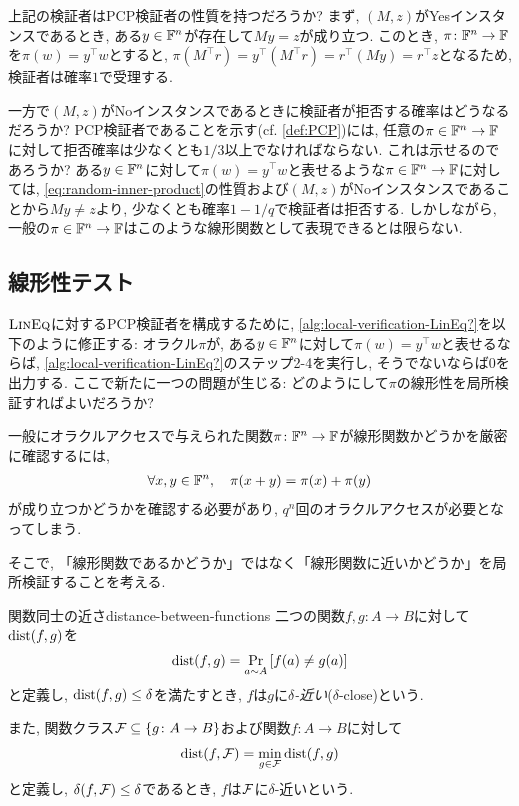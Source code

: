 上記の検証者はPCP検証者の性質を持つだろうか?
まず, $(M,z)$がYesインスタンスであるとき, ある$y\in\mathbb{F}^n$が存在して$My=z$が成り立つ.
このとき, $\pi\colon\mathbb{F}^n\to\mathbb{F}$を$\pi(w)=y^\top w$とすると, $\pi(M^\top r)=y^\top (M^\top r)=r^\top (My)=r^\top z$となるため, 検証者は確率$1$で受理する.

一方で$(M,z)$がNoインスタンスであるときに検証者が拒否する確率はどうなるだろうか?
PCP検証者であることを示す(cf. \cref{def:PCP})には, 任意の$\pi\in\mathbb{F}^n\to\mathbb{F}$に対して拒否確率は少なくとも$1/3$以上でなければならない.
これは示せるのであろうか?
ある$y\in\mathbb{F}^n$に対して$\pi(w)=y^\top w$と表せるような$\pi\in\mathbb{F}^n\to\mathbb{F}$に対しては, \cref{eq:random-inner-product}の性質および$(M,z)$がNoインスタンスであることから$My\ne z$より, 少なくとも確率$1-1/q$で検証者は拒否する.
しかしながら, 一般の$\pi\in\mathbb{F}^n\to\mathbb{F}$はこのような線形関数として表現できるとは限らない.

\subsection{線形性テスト}
$\textsc{LinEq}$に対するPCP検証者を構成するために,
\cref{alg:local-verification-LinEq?}を以下のように修正する:
オラクル$\pi$が, ある$y\in\mathbb{F}^n$に対して$\pi(w)=y^\top w$と表せるならば, \cref{alg:local-verification-LinEq?}のステップ2-4を実行し, そうでないならば$0$を出力する.
ここで新たに一つの問題が生じる: どのようにして$\pi$の線形性を局所検証すればよいだろうか?

一般にオラクルアクセスで与えられた関数$\pi\colon\mathbb{F}^n\to\mathbb{F}$が線形関数かどうかを厳密に確認するには,
\begin{align}
  \forall x,y\in\mathbb{F}^n,\quad \pi(x+y)=\pi(x)+\pi(y) \label{eq:linearity-test-all-points}
\end{align}
が成り立つかどうかを確認する必要があり, $q^n$回のオラクルアクセスが必要となってしまう.

そこで, 「線形関数であるかどうか」ではなく「線形関数に近いかどうか」を局所検証することを考える.
\begin{definition}{関数同士の近さ}{distance-between-functions}
  二つの関数$f,g\colon A \to B$に対して$\mathrm{dist}(f,g)$を
  \begin{align*}
    \mathrm{dist}(f,g) =\Pr_{a\sim A} \qty[ f(a) \ne g(a) ]
  \end{align*}
  と定義し, $\mathrm{dist}(f,g)\le\delta$を満たすとき, $f$は$g$に\emph{$\delta$-近い}($\delta$-close)という.
  
  また, 関数クラス$\mathcal{F}\subseteq \qty{ g\colon A\to B }$および関数$f\colon A\to B$に対して
  \begin{align*}
    \mathrm{dist}(f,\mathcal{F}) = \min_{g\in\mathcal{F}} \mathrm{dist}(f,g)
  \end{align*}
  と定義し, $\delta(f,\mathcal{F})\le \delta$であるとき, $f$は$\mathcal{F}$に$\delta$-近いという.
\end{definition}

